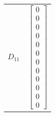 \begin{tabular}{cl}
 $D_{11}$ & $\left[\begin{matrix}0\\0\\0\\0\\0\\0\\0\\0\\0\\0\\0\\0\end{matrix}\right]$                                                                                                                                                                                                                                                                                                                                                                                                                                                                                                                                                                                                                                                                                                                                                                                                                                                                                                                                                                                                                                                                                                                                                                                                                                                                                                                                                                                                                                                                                                                                                                                                                                                                                                                                                                     \\

\end{tabular}
